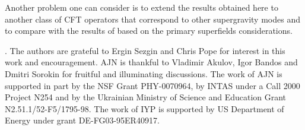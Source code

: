 \documentclass[a4paper,11pt]{article}
\begin{document}
Another problem one can consider is to extend the results obtained
here to another class of CFT operators that correspond to other
supergravity modes and to compare with the results of
\cite{ferrara} based on the primary superfields considerations.


\vspace{1cm} . \noindent The
authors are grateful to Ergin Sezgin and Chris Pope for interest in
this work and encouragement. AJN is thankful to Vladimir Akulov, Igor Bandos
and Dmitri Sorokin for fruitful and illuminating discussions. The
work of AJN is supported in part by the NSF Grant PHY-0070964,
by INTAS under a Call 2000 Project N254 and by the Ukrainian
Ministry of Science and Education Grant N2.51.1/52-F5/1795-98.
The work of IYP is supported by US Department of Energy under grant
DE-FG03-95ER40917.





\newpage
\end{document}
